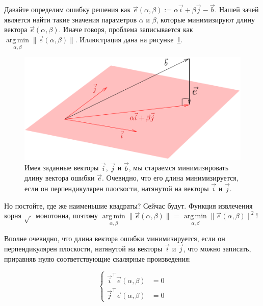 \documentclass{article}
\DeclareMathOperator*{\argmin}{arg\,min}
\begin{document}
Давайте определим ошибку решения как $\vec{e}(\alpha, \beta) :=  \alpha \vec{i} + \beta\vec{j} - \vec b$.
Нашей зачей является найти такие значения параметров $\alpha$ и $\beta$, которые минимизируют длину вектора $\vec{e}(\alpha, \beta)$. Иначе говоря, проблема записывается как $\argmin\limits_{\alpha, \beta} \|\vec{e}(\alpha, \beta)\|$.
Иллюстрация дана на рисунке~\ref{fig:error}.

\begin{figure}[ht]
	\centering
	\includegraphics[width=.7\linewidth]{error}
	\caption{Имея заданные векторы $\vec i$, $\vec j$ и $\vec b$, мы стараемся минимизировать длину вектора ошибки $\vec e$. Очевидно, что его длина минимизируется, если он перпендикулярен плоскости, натянутой на векторы $\vec i$ и $\vec j$.}
	\label{fig:error}
\end{figure}

Но постойте, где же наименьшие квадраты? Сейчас будут. Функция извлечения корня $\sqrt{\cdot}$ монотонна, поэтому $\argmin\limits_{\alpha, \beta} \|\vec{e}(\alpha, \beta)\|$ = $\argmin\limits_{\alpha, \beta} \|\vec{e}(\alpha, \beta)\|^2$!

Вполне очевидно, что длина вектора ошибки минимизируется, если он перпендикулярен плоскости, натянутой на векторы $\vec i$ и $\vec j$, что можно записать, приравняв нулю соответствующие скалярные произведения:

$$
\left\{
\begin{split}\vec{i}^\top \vec{e}(\alpha, \beta) &= 0\\
\vec{j}^\top \vec{e}(\alpha, \beta) &= 0
\end{split}
\right.
$$
\end{document}
